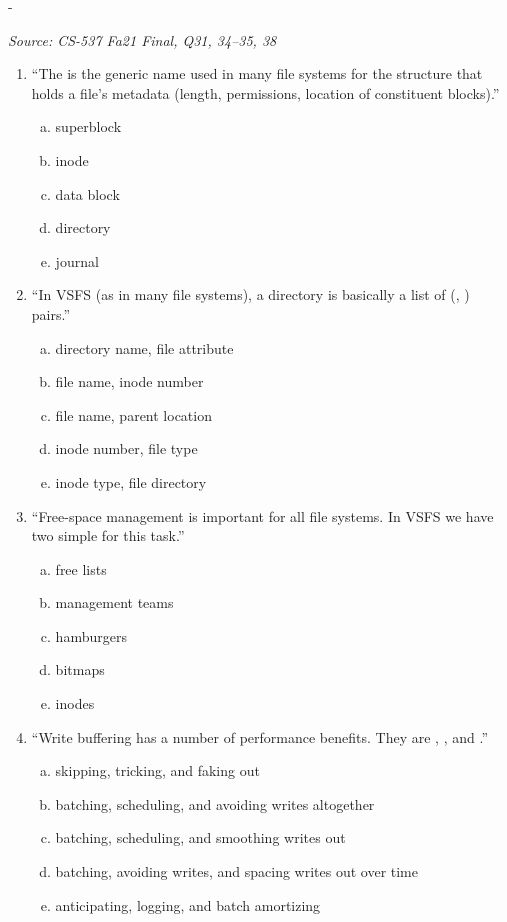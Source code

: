 \documentclass[11pt,a4paper]{article}
\makeatletter
\newcommand{\keepspace}[1]{\par\penalty-100\begingroup
  \setlength{\dimen@}{#1}\dimen@ii\pagegoal\advance\dimen@ii-\pagetotal
  \ifdim\dimen@>\dimen@ii\ifdim\dimen@ii>\z@\vfil\fi\break\fi\endgroup}
\newcounter{qn}[section]
\newenvironment{Qn}[4]{%
  \refstepcounter{qn}\keepspace{7\baselineskip}%
  \begin{tcolorbox}[qboxstyle, title={Q\thesection.\theqn\ \ [#1 \textbar\ #2]\ \ #4}]%
  {\footnotesize\color{g3}\textit{Source: #3}}\par\smallskip%
}{%
  \end{tcolorbox}%
}
\makeatother
\begin{document}
\begin{Qn}{Easy-Medium}{Lect 24}{CS-537 Fa21 Final, Q31, 34--35, 38}{Inode, directory pairs, bitmaps, write buffering}
\begin{enumerate}[(31)]
\item ``The \underline{\hspace{1.5em}} is the generic name used in many
      file systems for the structure that holds a file's metadata
      (length, permissions, location of constituent blocks).''
\begin{enumerate}[(a)]
\item superblock
\item inode
\item data block
\item directory
\item journal
\end{enumerate}
\item ``In VSFS (as in many file systems), a directory is basically a
      list of (\underline{\hspace{1em}}, \underline{\hspace{1em}}) pairs.''
\begin{enumerate}[(a)]
\item directory name, file attribute
\item file name, inode number
\item file name, parent location
\item inode number, file type
\item inode type, file directory
\end{enumerate}
\item ``Free-space management is important for all file systems. In
      VSFS we have two simple \underline{\hspace{1.5em}} for this task.''
\begin{enumerate}[(a)]
\item free lists
\item management teams
\item hamburgers
\item bitmaps
\item inodes
\end{enumerate}
\item ``Write buffering has a number of performance benefits. They
      are \underline{\hspace{1em}}, \underline{\hspace{1em}}, and
      \underline{\hspace{1em}}.''
\begin{enumerate}[(a)]
\item skipping, tricking, and faking out
\item batching, scheduling, and avoiding writes altogether
\item batching, scheduling, and smoothing writes out
\item batching, avoiding writes, and spacing writes out over time
\item anticipating, logging, and batch amortizing
\end{enumerate}
\end{enumerate}
\end{Qn}
\end{document}
